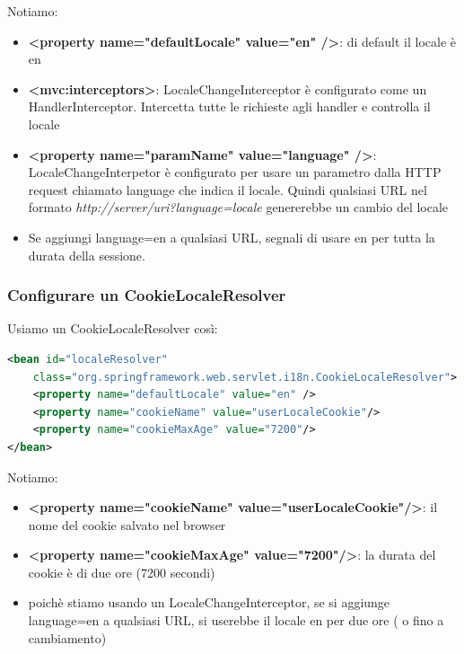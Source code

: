 \documentclass[11pt,a4paper]{book}
\begin{document}
Notiamo:
\begin{itemize}
	\item \textbf{<property name="defaultLocale" value="en" />}: di default il locale è en
	\item \textbf{<mvc:interceptors>}: LocaleChangeInterceptor è configurato come un HandlerInterceptor. Intercetta tutte le richieste agli handler e controlla il locale
	\item \textbf{<property name="paramName" value="language" />}: LocaleChangeInterpetor è configurato per usare un parametro dalla HTTP request chiamato language che indica il locale. Quindi qualsiasi URL nel formato \emph{http://server/uri?language={locale}} genererebbe un cambio del locale
	\item Se aggiungi language=en a qualsiasi URL, segnali di usare en per tutta la durata della sessione.
\end{itemize}

\subsubsection{Configurare un CookieLocaleResolver}
Usiamo un CookieLocaleResolver così:
\begin{lstlisting}[language = XML]
<bean id="localeResolver"
	class="org.springframework.web.servlet.i18n.CookieLocaleResolver">
	<property name="defaultLocale" value="en" />
	<property name="cookieName" value="userLocaleCookie"/>
	<property name="cookieMaxAge" value="7200"/>
</bean>
\end{lstlisting}
Notiamo:
\begin{itemize}
	\item \textbf{<property name="cookieName" value="userLocaleCookie"/>}: il nome del cookie salvato nel browser
	\item \textbf{<property name="cookieMaxAge" value="7200"/>}: la durata del cookie è di due ore (7200 secondi)
	\item  poichè stiamo usando un LocaleChangeInterceptor, se si aggiunge language=en a qualsiasi URL, si userebbe il locale en per due ore ( o fino a cambiamento)
\end{itemize}
\end{document}

